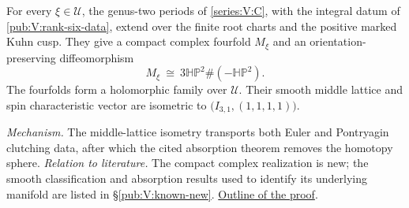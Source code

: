 \hypertarget{main-V-D}{}
\begin{maintheorem}
\hypertarget{tag-03KU}{}\label{series:V:D}
For every $\xi\in\mathcal U$, the genus-two periods of
\cref{series:V:C}, with the integral datum of
\cref{pub:V:rank-six-data}, extend over the finite root charts
and the positive marked Kuhn cusp. They give a compact complex
fourfold $M_\xi$ and an orientation-preserving diffeomorphism
\[
 M_\xi\ \cong\ 3\mathbb{HP}^2\#(-\mathbb{HP}^2).
\]
The fourfolds form a holomorphic family over $\mathcal U$.
Their smooth middle lattice and spin characteristic vector are
isometric to $\bigl(I_{3,1},(1,1,1,1)\bigr)$.
\end{maintheorem}

\textit{Mechanism.} The middle-lattice isometry transports both Euler and Pontryagin clutching data, after which the cited absorption theorem removes the homotopy sphere.
\textit{Relation to literature.} The compact complex realization is new; the smooth classification and absorption results used to identify its underlying manifold are listed in \S\ref{pub:V:known-new}.
\hyperlink{outline-V-D}{Outline of the proof}.

